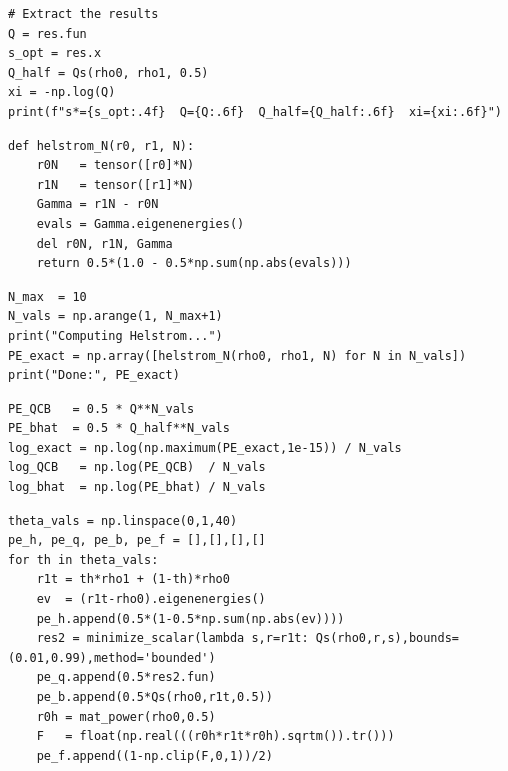 \begin{lstlisting}[style=pythonstyle, caption={Extracting the results}]
# Extract the results
Q = res.fun
s_opt = res.x
Q_half = Qs(rho0, rho1, 0.5)
xi = -np.log(Q)
print(f"s*={s_opt:.4f}  Q={Q:.6f}  Q_half={Q_half:.6f}  xi={xi:.6f}")
\end{lstlisting}


\begin{lstlisting}[style=pythonstyle, caption={Defining a function to return the N trails accumulated helstrom bounds}]
def helstrom_N(r0, r1, N):
    r0N   = tensor([r0]*N)
    r1N   = tensor([r1]*N)
    Gamma = r1N - r0N
    evals = Gamma.eigenenergies()
    del r0N, r1N, Gamma
    return 0.5*(1.0 - 0.5*np.sum(np.abs(evals)))
\end{lstlisting}


\begin{lstlisting}[style=pythonstyle, caption={Computing the helstrom bounds}]
N_max  = 10
N_vals = np.arange(1, N_max+1)
print("Computing Helstrom...")
PE_exact = np.array([helstrom_N(rho0, rho1, N) for N in N_vals])
print("Done:", PE_exact)
\end{lstlisting}


\begin{lstlisting}[style=pythonstyle, caption={Calculating the probabilities of error}]
PE_QCB   = 0.5 * Q**N_vals
PE_bhat  = 0.5 * Q_half**N_vals
log_exact = np.log(np.maximum(PE_exact,1e-15)) / N_vals
log_QCB   = np.log(PE_QCB)  / N_vals
log_bhat  = np.log(PE_bhat) / N_vals
\end{lstlisting}


\begin{lstlisting}[style=pythonstyle, caption={Finding the probability of error for different thetas over different bounds}]
theta_vals = np.linspace(0,1,40)
pe_h, pe_q, pe_b, pe_f = [],[],[],[]
for th in theta_vals:
    r1t = th*rho1 + (1-th)*rho0
    ev  = (r1t-rho0).eigenenergies()
    pe_h.append(0.5*(1-0.5*np.sum(np.abs(ev))))
    res2 = minimize_scalar(lambda s,r=r1t: Qs(rho0,r,s),bounds=(0.01,0.99),method='bounded')
    pe_q.append(0.5*res2.fun)
    pe_b.append(0.5*Qs(rho0,r1t,0.5))
    r0h = mat_power(rho0,0.5)
    F   = float(np.real(((r0h*r1t*r0h).sqrtm()).tr()))
    pe_f.append((1-np.clip(F,0,1))/2)
\end{lstlisting}



